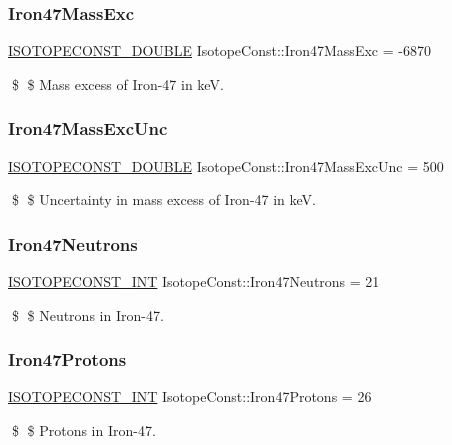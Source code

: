 \subsubsection{\texorpdfstring{Iron47\+Mass\+Exc}{Iron47MassExc}}
{\footnotesize\ttfamily \mbox{\hyperlink{group___isotope_const-_macros_ga8f45a7272ce02c0b4c65c44636ed719a}{I\+S\+O\+T\+O\+P\+E\+C\+O\+N\+S\+T\+\_\+\+D\+O\+U\+B\+LE}} Isotope\+Const\+::\+Iron47\+Mass\+Exc = -\/6870}

\$ \$ Mass excess of Iron-\/47 in keV. \mbox{\label{group___isotope_const-_iron-_fe47_ga58def914d8eb2df4ae0f8ea6ca01ecc6}} 
\subsubsection{\texorpdfstring{Iron47\+Mass\+Exc\+Unc}{Iron47MassExcUnc}}
{\footnotesize\ttfamily \mbox{\hyperlink{group___isotope_const-_macros_ga8f45a7272ce02c0b4c65c44636ed719a}{I\+S\+O\+T\+O\+P\+E\+C\+O\+N\+S\+T\+\_\+\+D\+O\+U\+B\+LE}} Isotope\+Const\+::\+Iron47\+Mass\+Exc\+Unc = 500}

\$ \$ Uncertainty in mass excess of Iron-\/47 in keV. \mbox{\label{group___isotope_const-_iron-_fe47_gae88b618d53af27ac5a09c01fb023316a}} 
\subsubsection{\texorpdfstring{Iron47\+Neutrons}{Iron47Neutrons}}
{\footnotesize\ttfamily \mbox{\hyperlink{group___isotope_const-_macros_ga5f18360b3e99483a35c32d789e62621c}{I\+S\+O\+T\+O\+P\+E\+C\+O\+N\+S\+T\+\_\+\+I\+NT}} Isotope\+Const\+::\+Iron47\+Neutrons = 21}

\$ \$ Neutrons in Iron-\/47. \mbox{\label{group___isotope_const-_iron-_fe47_ga759c28ddcb963e059b69cd380509de33}} 
\subsubsection{\texorpdfstring{Iron47\+Protons}{Iron47Protons}}
{\footnotesize\ttfamily \mbox{\hyperlink{group___isotope_const-_macros_ga5f18360b3e99483a35c32d789e62621c}{I\+S\+O\+T\+O\+P\+E\+C\+O\+N\+S\+T\+\_\+\+I\+NT}} Isotope\+Const\+::\+Iron47\+Protons = 26}

\$ \$ Protons in Iron-\/47. 